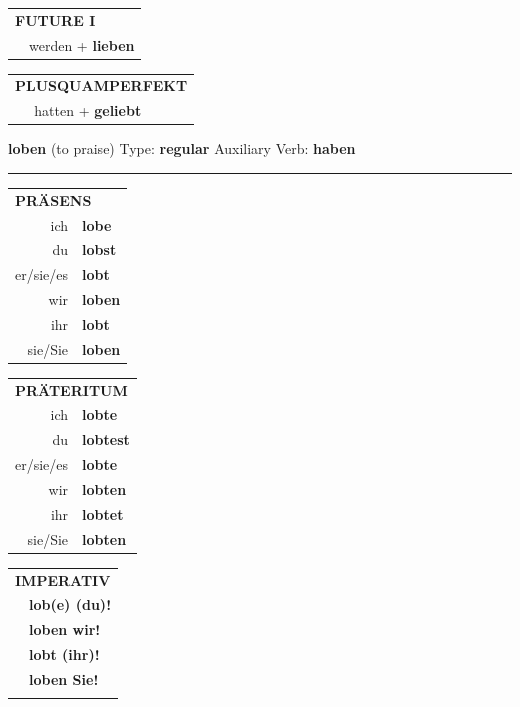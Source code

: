 \documentclass[10pt,a4paper]{revtex4-2}
\begin{document}
\begin{verbbox-acc}
\begin{tabular}{rl}
    \multicolumn{2}{l}{\textbf{FUTURE I} }\\
   & werden + \textbf{lieben}\\
 
  \end{tabular}
\hfill
   \begin{tabular}{rl}
      \multicolumn{2}{l}{\textbf{PLUSQUAMPERFEKT}}\\
   & hatten + \textbf{geliebt}\\
  \end{tabular}
  
  \vspace{-5pt}


\end{verbbox-acc}

\begin{verbbox}
    {\Large \bf loben} (to praise) \hfill Type: \textbf{regular} \hfill Auxiliary Verb: \textbf{haben} 
    
     \vspace{5pt}

    \hrule
    
    \vspace{5pt}

  \begin{tabular}{rl}
     \multicolumn{2}{l}{\textbf{PRÄSENS} }\\
    ich & \textbf{lobe}\\
    du & \textbf{lobst}\\
    er/sie/es & \textbf{lobt}\\
    wir & \textbf{loben}\\
    ihr & \textbf{lobt}\\
    sie/Sie & \textbf{loben}\\
  \end{tabular}
  \hfill
     \begin{tabular}{rl}
    \multicolumn{2}{l}{\textbf{PRÄTERITUM} }\\
    ich & \textbf{lobte}\\
    du & \textbf{lobtest}\\
    er/sie/es & \textbf{lobte}\\
    wir & \textbf{lobten}\\
    ihr & \textbf{lobtet}\\
    sie/Sie & \textbf{lobten}\\
  \end{tabular}
  \hfill
  \begin{tabular}{rl}
     \multicolumn{2}{l}{\textbf{IMPERATIV} }\\
   & \textbf{lob(e) (du)!}\\
   & \textbf{loben wir!}\\
   & \textbf{lobt (ihr)!}\\
   & \textbf{loben Sie!}\\
   & \vspace{10pt}
  \end{tabular}


\end{verbbox}
\end{document}
